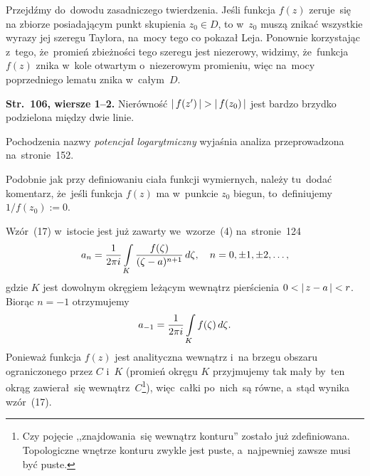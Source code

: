 \documentclass[a4paper,11pt]{article}
\begin{document}
Przejdźmy do~dowodu zasadniczego twierdzenia. Jeśli funkcja $f( z )$
zeruje~się na zbiorze posiadającym punkt skupienia $z_{ 0 } \in D$, to
w~$z_{ 0 }$ muszą znikać wszystkie wyrazy jej szeregu Taylora, na~mocy
tego co pokazał Leja. Ponownie korzystając z~tego, że~promień
zbieżności tego szeregu jest niezerowy, widzimy, że~funkcja~$f( z )$
znika w~kole otwartym o~niezerowym promieniu, więc na~mocy
poprzedniego lematu znika w~całym~$D$.

\vspace{\spaceFour}


\start \textbf{Str.~106, wiersze 1--2.} Nierówność
$\left| \,  f( z' )  \, \right| > \left| \,  f( z_{ 0 } )  \, \right|$ jest bardzo brzydko
podzielona między dwie linie.

\vspace{\spaceFour}


\start {} Pochodzenia nazwy \emph{potencjał logarytmiczny}
wyjaśnia analiza przeprowadzona na~stronie~152.

\vspace{\spaceFour}


\start {} Podobnie jak przy definiowaniu ciała funkcji
wymiernych, należy tu~dodać komentarz, że~jeśli funkcja $f( z )$ ma
w~punkcie $z_{ 0 }$ biegun, to~definiujemy $1 / f( z_{ 0 } ) := 0$.

\vspace{\spaceFour}


\start {} Wzór~(17) w~istocie jest już zawarty we~wzorze~(4)
na~stronie~124
\begin{equation}
  \label{eq:Leja-43}
  a_{ n } = \frac{ 1 }{ 2\pi i }
  \int\limits_{ K } \frac{ f( \zeta ) }{ ( \zeta - a )^{ n + 1 } } \, d\zeta,
  \quad n = 0, \pm 1, \pm 2, \ldots,
\end{equation}
gdzie $K$ jest dowolnym okręgiem leżącym wewnątrz pierścienia
$0 < \left| \,  z - a  \, \right| < r$. Biorąc $n = -1$ otrzymujemy
\begin{equation}
  \label{eq:Leja-44}
  a_{ -1 } = \frac{ 1 }{ 2\pi i } \int\limits_{ K } f( \zeta )\, d\zeta.
\end{equation}
Ponieważ funkcja $f( z )$ jest analityczna wewnątrz i~na brzegu
obszaru ograniczonego przez $C$ i~$K$ (promień okręgu $K$ przyjmujemy
tak mały by~ten okrąg zawierał~się wewnątrz~$C$\footnote{Czy pojęcie
  ,,znajdowania~się wewnątrz konturu'' zostało już zdefiniowana.
  Topologiczne wnętrze konturu zwykle jest puste, a~najpewniej zawsze
  musi być puste.}), więc~całki po~nich~są równe, a~stąd wynika
wzór~(17).

\vspace{\spaceFour}
\end{document}
